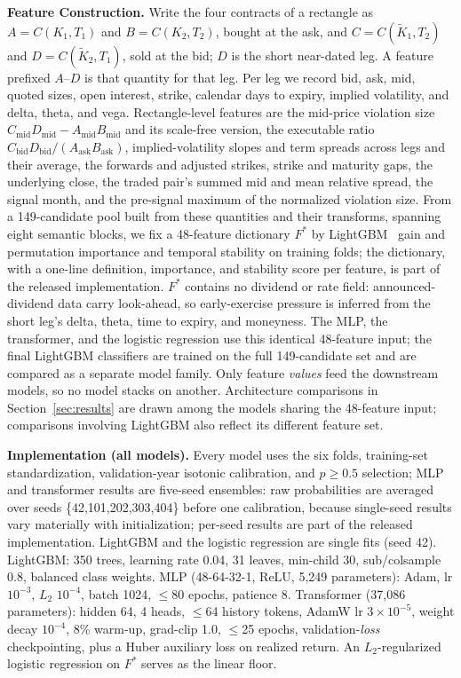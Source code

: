 \documentclass[sigconf,review,anonymous]{acmart}
\begin{document}
\medskip\noindent\textbf{Feature Construction.}
\label{sec:features}
Write the four contracts of a rectangle as $A=C(K_1,T_1)$ and $B=C(K_2,T_2)$, bought at the ask, and $C=C(\tilde K_1,T_2)$ and $D=C(\tilde K_2,T_1)$, sold at the bid; $D$ is the short near-dated leg. A feature prefixed $A$--$D$ is that quantity for that leg. Per leg we record bid, ask, mid, quoted sizes, open interest, strike, calendar days to expiry, implied volatility, and delta, theta, and vega. Rectangle-level features are the mid-price violation size $C_{\mathrm{mid}}D_{\mathrm{mid}}-A_{\mathrm{mid}}B_{\mathrm{mid}}$ and its scale-free version, the executable ratio $C_{\mathrm{bid}}D_{\mathrm{bid}}/(A_{\mathrm{ask}}B_{\mathrm{ask}})$, implied-volatility slopes and term spreads across legs and their average, the forwards and adjusted strikes, strike and maturity gaps, the underlying close, the traded pair's summed mid and mean relative spread, the signal month, and the pre-signal maximum of the normalized violation size. From a 149-candidate pool built from these quantities and their transforms, spanning eight semantic blocks, we fix a 48-feature dictionary $F^{\ast}$ by LightGBM~\cite{ke2017lightgbm} gain and permutation importance and temporal stability on training folds; the dictionary, with a one-line definition, importance, and stability score per feature, is part of the released implementation. $F^{\ast}$ contains no dividend or rate field: announced-dividend data carry look-ahead, so early-exercise pressure is inferred from the short leg's delta, theta, time to expiry, and moneyness. The MLP, the transformer, and the logistic regression use this identical 48-feature input; the final LightGBM classifiers are trained on the full 149-candidate set and are compared as a separate model family. Only feature \emph{values} feed the downstream models, so no model stacks on another. Architecture comparisons in Section~\ref{sec:results} are drawn among the models sharing the 48-feature input; comparisons involving LightGBM also reflect its different feature set.

\noindent\textbf{Implementation (all models).} Every model uses the six folds, training-set standardization, validation-year isotonic calibration, and $p\ge0.5$ selection; MLP and transformer results are five-seed ensembles: raw probabilities are averaged over seeds \{42,101,202,303,404\} before one calibration, because single-seed results vary materially with initialization; per-seed results are part of the released implementation. LightGBM and the logistic regression are single fits (seed 42). LightGBM: 350 trees, learning rate 0.04, 31 leaves, min-child 30, sub/colsample 0.8, balanced class weights. MLP (48-64-32-1, ReLU, 5{,}249 parameters): Adam, lr $10^{-3}$, $L_2$ $10^{-4}$, batch 1024, $\le$80 epochs, patience 8. Transformer (37{,}086 parameters): hidden 64, 4 heads, $\le$64 history tokens, AdamW lr $3{\times}10^{-5}$, weight decay $10^{-4}$, 8\% warm-up, grad-clip 1.0, $\le$25 epochs, validation-\emph{loss} checkpointing, plus a Huber auxiliary loss on realized return. An $L_2$-regularized logistic regression on $F^{\ast}$ serves as the linear floor.
\end{document}
